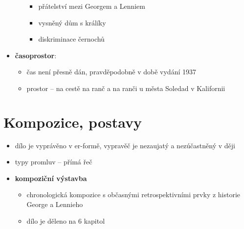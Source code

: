 \documentclass[10pt,a4paper]{article}
\begin{document}
\begin{itemize}
\begin{itemize}
\begin{itemize}
		\item přátelství mezi Georgem a Lenniem
		\item vysněný dům s králíky
		\item diskriminace černochů
		\end{itemize}
	\end{itemize}
\item \textbf{časoprostor}: 
	\begin{itemize}
	\item čas není přesně dán, pravděpodobně v době vydání 1937
	\item prostor -- na cestě na ranč a na ranči u města Soledad v Kalifornii
	\end{itemize}

\end{itemize}
\section*{Kompozice, postavy}
\begin{itemize}
\item dílo je vyprávěno v er-formě, vypravěč je nezaujatý a nezúčastněný v ději
\item typy promluv -- přímá řeč
\item \textbf{kompoziční výstavba}
	\begin{itemize}
	\item chronologická kompozice s občasnými retrospektivními prvky z historie George a Lennieho 
	\item dílo je děleno na 6 kapitol
	\end{itemize}
\end{itemize}
\end{document}

